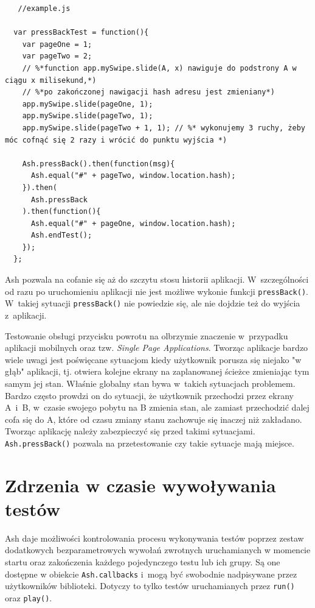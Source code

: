 \documentclass[brudnopis]{xmgr}
\begin{document}
\begin{lstlisting}
   //example.js

  var pressBackTest = function(){
    var pageOne = 1;
    var pageTwo = 2;
    // %*function app.mySwipe.slide(A, x) nawiguje do podstrony A w ciągu x milisekund,*)
    // %*po zakończonej nawigacji hash adresu jest zmieniany*)
    app.mySwipe.slide(pageOne, 1); 
    app.mySwipe.slide(pageTwo, 1); 
    app.mySwipe.slide(pageTwo + 1, 1); // %* wykonujemy 3 ruchy, żeby móc cofnąć się 2 razy i wrócić do punktu wyjścia *)
    
    Ash.pressBack().then(function(msg){
      Ash.equal("#" + pageTwo, window.location.hash);
    }).then(
      Ash.pressBack
    ).then(function(){
      Ash.equal("#" + pageOne, window.location.hash);
      Ash.endTest();
    });
  };
\end{lstlisting}

Ash pozwala na cofanie się aż do szczytu stosu historii aplikacji. W~szczególności od razu po uruchomieniu aplikacji nie jest możliwe wykonie funkcji \texttt{pressBack()}. W~takiej sytuacji \texttt{pressBack()} nie powiedzie się, ale nie dojdzie też do wyjścia z~aplikacji.

Testowanie obsługi przycisku powrotu na olbrzymie znaczenie w~przypadku aplikacji mobilnych oraz tzw. \textit{Single Page Applications}. Tworząc aplikacje bardzo wiele uwagi jest poświęcane sytuacjom kiedy użytkownik porusza się niejako "w głąb" aplikacji, tj. otwiera kolejne ekrany na zaplanowanej ścieżce zmieniając tym samym jej stan.  Właśnie globalny stan bywa w~takich sytuacjach problemem. Bardzo często prowdzi on do sytuacji, że użytkownik przechodzi przez ekrany A~i~B, w~czasie swojego pobytu na B zmienia stan, ale zamiast przechodzić dalej cofa się do A, które od czasu zmiany stanu zachowuje się inaczej niż zakładano. Tworząc aplikację należy zabezpieczyć się przed takimi sytuacjami. \texttt{Ash.pressBack()} pozwala na przetestowanie czy takie sytuacje mają miejsce. 

\section{Zdrzenia w czasie wywoływania testów}

Ash daje możliwości kontrolowania procesu wykonywania testów poprzez zestaw dodatkowych bezparametrowych wywołań zwrotnych uruchamianych w momencie startu oraz zakończenia każdego pojedynczego testu lub ich grupy. Są one dostępne w obiekcie \texttt{Ash.callbacks} i~mogą być swobodnie nadpisywane przez użytkowników biblioteki. Dotyczy to tylko testów uruchamianych przez \texttt{run()} oraz \texttt{play()}.
\end{document}
